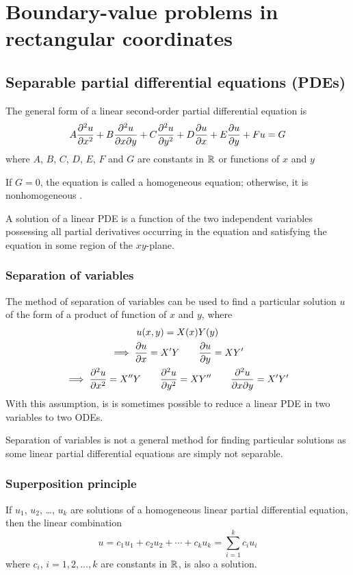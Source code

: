 \documentclass[10pt, twocolumn]{article}
\begin{document}
\section{Boundary-value problems in rectangular coordinates}
\subsection{Separable partial differential equations (PDEs)}
The general form of a linear second-order partial differential equation is
\[
  A\frac{\partial^{2} u}{\partial x^{2}} + B \frac{\partial ^2 u}{\partial x \partial y} + C \frac{\partial^{2} u}{\partial y^{2}} + D \frac{\partial u}{\partial x} + E \frac{\partial u}{\partial y} + F u = G
\]
where \(A\), \(B\), \(C\), \(D\), \(E\), \(F\) and \(G\) are constants in \(\mathbb{R}_{}^{}\) or functions of \(x\) and \(y\)

\begin{remark}
  If \(G = 0\), the equation is called a homogeneous equation; otherwise, it is nonhomogeneous .
\end{remark}

A solution of a linear PDE is a function of the two independent variables possessing all partial derivatives occurring in the equation and satisfying the equation in some region of the \(xy\)-plane.


\subsubsection{Separation of variables}
The method of separation of variables can be used to find a particular solution \(u\) of the form of a product of function of \(x\) and \(y\), where
\begin{gather*}
  u(x,y) = X(x) Y(y) \\
  \implies \frac{\partial u}{\partial x} = X'Y \qquad \frac{\partial u}{\partial y} = XY' \\
  \implies \frac{\partial^{2} u}{\partial x^{2}} = X''Y \qquad \frac{\partial^{2} u}{\partial y^{2}} = XY'' \qquad \frac{\partial ^2 u}{\partial x \partial y} = X'Y'
\end{gather*}
With this assumption, is is sometimes possible to reduce a linear PDE in two variables to two ODEs.

Separation of variables is not a general method for finding particular solutions as some linear partial differential equations are simply not separable.


\subsubsection{Superposition principle}
If \(u_1\), \(u_2\), \dots{}, \(u_k\) are solutions of a homogeneous linear partial differential equation, then the linear combination
\[
  u = c_1 u_1 + c_2 u_2 + \cdots + c_k u_k = \sum_{i = 1}^k{c_i u_i}
\]
where \(c_i\), \(i = 1, 2, \dots, k\) are constants in \(\mathbb{R}_{}^{}\), is also a solution.
\end{document}
